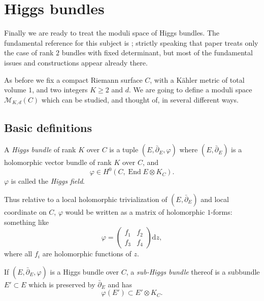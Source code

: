 \documentclass[12pt,letterpaper,reqno]{article}
\numberwithin{equation}{section}
\newcommand{\cM}{\ensuremath{\mathcal M}}
\newcommand{\kahler}{K\"ahler\xspace}
\newcommand{\de}{\mathrm{d}}
\newcommand{\ti}[1]{\textit{#1}}
\DeclareMathOperator{\End}{End}
\begin{document}
\section{Higgs bundles}

Finally we are ready to treat the moduli space of Higgs bundles.
The fundamental reference for this subject is \cite{MR89a:32021};
strictly speaking that paper treats only the case of rank $2$ bundles
with fixed determinant, but most of the fundamental issues
and constructions appear already there.

As before we fix a compact Riemann surface $C$, with a
\kahler metric of total volume $1$, and two integers
$K \ge 2$ and $d$.
We are going to define a moduli space $\cM_{K,d}(C)$ which can be
studied, and thought of, in several different ways.


\subsection{Basic definitions}

\begin{defn} \label{def:higgs-bundle}
A \ti{Higgs bundle} of rank $K$ over $C$
is a tuple $(E, \bar\partial_E, \varphi)$
where $(E,\bar\partial_E)$ is a holomorphic vector bundle
of rank $K$ over $C$, and
\begin{equation}
\varphi \in H^0(C, \End E \otimes K_C).
\end{equation}
$\varphi$ is called the \ti{Higgs field}.
\end{defn}

Thus relative to a local holomorphic trivialization of $(E,\bar\partial_E)$
and local coordinate on $C$, $\varphi$ would
be written as a matrix of holomorphic $1$-forms: something like
\begin{equation}
  \varphi = \begin{pmatrix} f_1 & f_2 \\ f_3 & f_4 \end{pmatrix} \de z,
\end{equation}
where all $f_i$ are holomorphic functions of $z$.

\begin{defn} If $(E, \bar\partial_E, \varphi)$
is a Higgs bundle over $C$, a \ti{sub-Higgs bundle} thereof
is a subbundle $E' \subset E$ which is preserved by $\bar\partial_E$
and has
\begin{equation}
  \varphi(E') \subset E' \otimes K_C.
\end{equation}
\end{defn}
\end{document}

